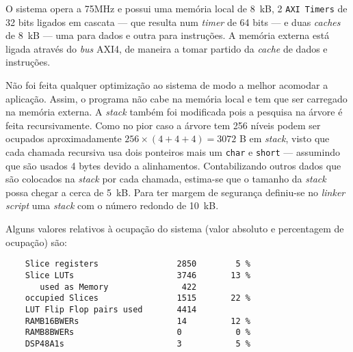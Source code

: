 O sistema opera a 75MHz e possui uma memória local de 8~kB, 2 \texttt{AXI~Timers} de 32 bits ligados em cascata --- que resulta num \textit{timer} de 64 bits --- e duas \textit{caches} de 8~kB --- uma para dados e outra para instruções. A memória externa está ligada através do \textit{bus} AXI4, de maneira a tomar partido da \textit{cache} de dados e instruções.

Não foi feita qualquer optimização ao sistema de modo a melhor acomodar a aplicação. Assim, o programa não cabe na memória local e tem que ser carregado na memória externa. A \textit{stack} também foi modificada pois a pesquisa na árvore é feita recursivamente. Como no pior caso a árvore tem 256 níveis podem ser ocupados aproximadamente $256 \times (4 + 4 + 4) = 3072$ B em \textit{stack}, visto que cada chamada recursiva usa dois ponteiros mais um \texttt{char} e \texttt{short} --- assumindo que são usados 4 bytes devido a alinhamentos. Contabilizando outros dados que são colocados na \textit{stack} por cada chamada, estima-se que o tamanho da \textit{stack} possa chegar a cerca de 5~kB. Para ter margem de segurança definiu-se no \textit{linker script} uma \textit{stack} com o número redondo de 10~kB.

Alguns valores relativos à ocupação do sistema (valor absoluto e percentagem de ocupação) são:

\begin{verbatim}
    Slice registers                2850        5 %
    Slice LUTs                     3746       13 %
       used as Memory               422
    occupied Slices                1515       22 %
    LUT Flip Flop pairs used       4414
    RAMB16BWERs                    14         12 %
    RAMB8BWERs                     0           0 %
    DSP48A1s                       3           5 %
\end{verbatim}

